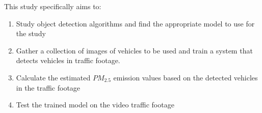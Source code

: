 %
%
This study specifically aims to:


\begin{comment}
How to formulate your research objectives:
1. Identify what research steps do you need to perform to achieve your general objective.
2. Identify the questions that must be answered for you to achieve your general objective.
    Thereafter, convert these questions into action statements

Example #1:

Research Question:
  What are the general features of a web-based learning environment?

Specific Objective:
   To review existing web-based learning environment that teaches language learning for children


Example #2:

Research Question:
   How will you represent commonsense knowledge for use by computer systems?

Specific Objective:
   To identify knowledge representation approaches used by existing story generation systems

Example #3:
Research Question:
   What types of storytelling knowledge are needed to generate stories?

Specific Objective:
    To identify the different types of storytelling knowledge used in generating stories

Example #4:
Research Question:
    What machine learning approaches will you utilize?

Specific Objective:
    To determine existing machine learning algorithms [that can be used in training the computer system to detect cyberbullying cases] 

Example #5: Research Question:
    How will your research output be evaluated?

Specific Objective:
    To define evaluation metrics for validating the accuracy of the translation

\end{comment}

%
%

\begin{enumerate}
   
   \item Study object detection algorithms and find the appropriate model to use for the study
   \item Gather a collection of images of vehicles to be used and train a system that detects vehicles in traffic footage.
   \item Calculate the estimated $PM_{2.5}$ emission values based on the detected vehicles in the traffic footage
   \item Test the trained model on the video traffic footage 
   

\end{enumerate}


